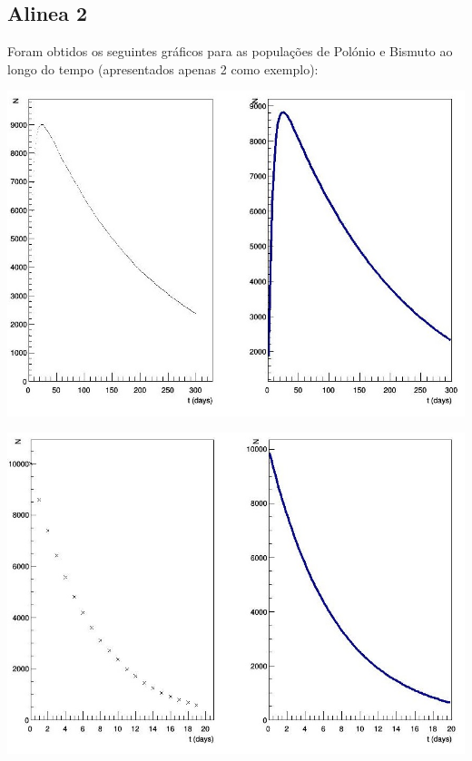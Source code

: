 \documentclass{article}
\begin{document}
\begin{multicols}{2}
  \subsection{Alinea 2}

  Foram obtidos os seguintes gráficos para as populações de Polónio e Bismuto ao longo do tempo (apresentados apenas 2 como exemplo):

  \begin{center}
    \includegraphics[scale=0.3]{DecayPo10000.jpg}
  \end{center}

\begin{center}
    \includegraphics[scale=0.3]{DecayBi10000.jpg}
  \end{center}
  

\end{multicols}
\end{document}
